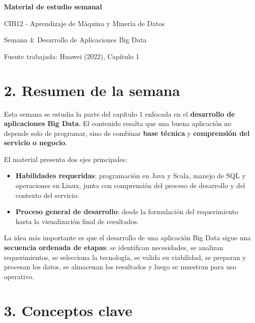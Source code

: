 \documentclass[8pt,a4paper,twocolumn]{article}
\begin{document}
\vspace*{-1.0em}
\begin{tcolorbox}[colback=black!12,colframe=black!35,boxrule=0.3pt,arc=1pt,left=4pt,right=4pt,top=3pt,bottom=3pt]
{\bfseries\normalsize Material de estudio semanal\par}
{\scriptsize CIB12 - Aprendizaje de M\'aquina y Miner\'ia de Datos\par}
{\scriptsize Semana 4: Desarrollo de Aplicaciones Big Data\par}
{\scriptsize Fuente trabajada: Huawei (2022), Cap\'itulo 1\par}
\end{tcolorbox}
\vspace{0.15em}

\section*{2. Resumen de la semana}

Esta semana se estudia la parte del capítulo 1 enfocada en el \textbf{desarrollo de aplicaciones Big Data}. El contenido resalta que una buena aplicación no depende solo de programar, sino de combinar \textbf{base técnica} y \textbf{comprensión del servicio o negocio}. 

El material presenta dos ejes principales:

\begin{itemize}[leftmargin=*]
    \item \textbf{Habilidades requeridas}: programación en Java y Scala, manejo de SQL y operaciones en Linux, junto con comprensión del proceso de desarrollo y del contexto del servicio.
    \item \textbf{Proceso general de desarrollo}: desde la formulación del requerimiento hasta la visualización final de resultados.
\end{itemize}

La idea más importante es que el desarrollo de una aplicación Big Data sigue una \textbf{secuencia ordenada de etapas}: se identifican necesidades, se analizan requerimientos, se selecciona la tecnología, se valida su viabilidad, se preparan y procesan los datos, se almacenan los resultados y luego se muestran para uso operativo.

\section*{3. Conceptos clave}
\end{document}
